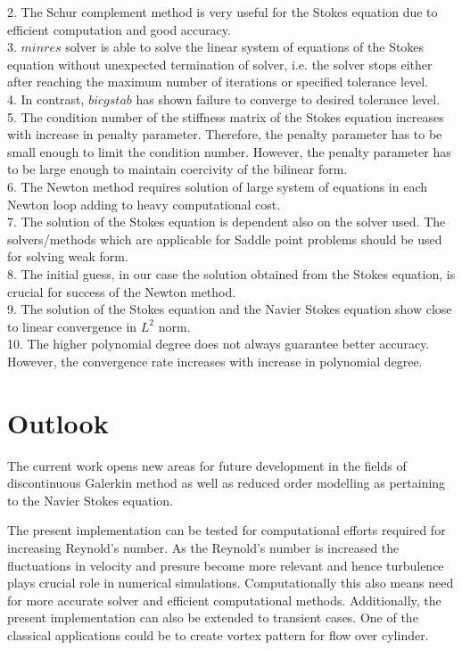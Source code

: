 \documentclass[a4paper,openany]{book}
\begin{document}
2. The Schur complement method is very useful for the Stokes equation due to efficient computation and good accuracy. \\

3. $minres$ solver is able to solve the linear system of equations of the Stokes equation without unexpected termination of solver, i.e. the solver stops either after reaching the maximum number of iterations or specified tolerance level.\\

4. In contrast, $bicgstab$ has shown failure to converge to desired tolerance level.\\

5. The condition number of the stiffness matrix of the Stokes equation increases with increase in penalty parameter. Therefore, the penalty parameter has to be small enough to limit the condition number. However, the penalty parameter has to be large enough to maintain coercivity of the bilinear form. \\

6. The Newton method requires solution of large system of equations in each Newton loop adding to heavy computational cost.\\

7. The solution of the Stokes equation is dependent also on the solver used. The solvers/methods which are applicable for Saddle point problems should be used for solving weak form.\\

8. The initial guess, in our case the solution obtained from the Stokes equation, is crucial for success of the Newton method.\\

9. The solution of the Stokes equation and the Navier Stokes equation show close to linear convergence in $L^2$ norm.\\

10. The higher polynomial degree does not always guarantee better accuracy. However, the convergence rate increases with increase in polynomial degree.

\section{Outlook}

The current work opens new areas for future development in the fields of discontinuous Galerkin method as well as reduced order modelling as pertaining to the Navier Stokes equation. 

The present implementation can be tested for computational efforts  required for increasing Reynold's number. As the Reynold's number is increased the fluctuations in velocity and presure become more relevant and hence turbulence plays crucial role in numerical simulations. Computationally this also means need for more accurate solver and efficient computational methods. Additionally, the present implementation can also be extended to transient cases. One of the classical applications could be to create vortex pattern for flow over cylinder.
\end{document}
